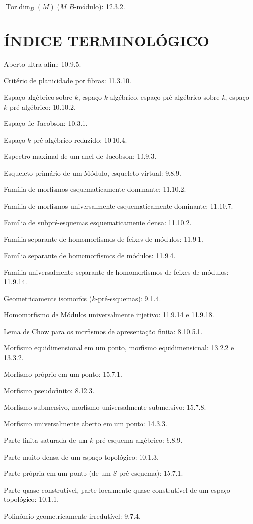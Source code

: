 $\operatorname{Tor.dim}_B(M)$ ($M$ $B$-módulo): 12.3.2.

\endgroup

\clearpage
{}
{}
\section*{ÍNDICE TERMINOLÓGICO}

\begingroup
\footnotesize
\setlength{\parindent}{0pt}
\setlength{\parskip}{1.1pt}
\newcommand{\EGAIVthreeTerm}[2]{#1: #2.\par}

\EGAIVthreeTerm{Aberto ultra-afim}{10.9.5}
\EGAIVthreeTerm{Critério de planicidade por fibras}{11.3.10}
\EGAIVthreeTerm{Espaço algébrico sobre $k$, espaço $k$-algébrico, espaço
pré-algébrico sobre $k$, espaço $k$-pré-algébrico}{10.10.2}
\EGAIVthreeTerm{Espaço de Jacobson}{10.3.1}
\EGAIVthreeTerm{Espaço $k$-pré-algébrico reduzido}{10.10.4}
\EGAIVthreeTerm{Espectro maximal de um anel de Jacobson}{10.9.3}
\EGAIVthreeTerm{Esqueleto primário de um Módulo, esqueleto virtual}{9.8.9}
\EGAIVthreeTerm{Família de morfismos esquematicamente dominante}{11.10.2}
\EGAIVthreeTerm{Família de morfismos universalmente esquematicamente dominante}{11.10.7}
\EGAIVthreeTerm{Família de subpré-esquemas esquematicamente densa}{11.10.2}
\EGAIVthreeTerm{Família separante de homomorfismos de feixes de módulos}{11.9.1}
\EGAIVthreeTerm{Família separante de homomorfismos de módulos}{11.9.4}
\EGAIVthreeTerm{Família universalmente separante de homomorfismos de feixes de módulos}{11.9.14}
\EGAIVthreeTerm{Geometricamente isomorfos ($k$-pré-esquemas)}{9.1.4}
\EGAIVthreeTerm{Homomorfismo de Módulos universalmente injetivo}{11.9.14 e 11.9.18}
\EGAIVthreeTerm{Lema de Chow para os morfismos de apresentação finita}{8.10.5.1}
\EGAIVthreeTerm{Morfismo equidimensional em um ponto, morfismo equidimensional}{13.2.2 e 13.3.2}
\EGAIVthreeTerm{Morfismo próprio em um ponto}{15.7.1}
\EGAIVthreeTerm{Morfismo pseudofinito}{8.12.3}
\EGAIVthreeTerm{Morfismo submersivo, morfismo universalmente submersivo}{15.7.8}
\EGAIVthreeTerm{Morfismo universalmente aberto em um ponto}{14.3.3}
\EGAIVthreeTerm{Parte finita saturada de um $k$-pré-esquema algébrico}{9.8.9}
\EGAIVthreeTerm{Parte muito densa de um espaço topológico}{10.1.3}
\EGAIVthreeTerm{Parte própria em um ponto (de um $S$-pré-esquema)}{15.7.1}
\EGAIVthreeTerm{Parte quase-construtível, parte localmente quase-construtível de um espaço topológico}{10.1.1}
\EGAIVthreeTerm{Polinômio geometricamente irredutível}{9.7.4}
